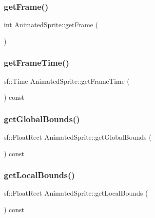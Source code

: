 \subsubsection{\texorpdfstring{get\+Frame()}{getFrame()}}
{\footnotesize\ttfamily int Animated\+Sprite\+::get\+Frame (\begin{DoxyParamCaption}{ }\end{DoxyParamCaption})}

\mbox{\label{class_animated_sprite_a5291f8e24fe2c6e4284bc7ff9499ef77}} 
\subsubsection{\texorpdfstring{get\+Frame\+Time()}{getFrameTime()}}
{\footnotesize\ttfamily sf\+::\+Time Animated\+Sprite\+::get\+Frame\+Time (\begin{DoxyParamCaption}{ }\end{DoxyParamCaption}) const}

\mbox{\label{class_animated_sprite_a86dca0906c53b3e630aaeac2f0085a0e}} 
\subsubsection{\texorpdfstring{get\+Global\+Bounds()}{getGlobalBounds()}}
{\footnotesize\ttfamily sf\+::\+Float\+Rect Animated\+Sprite\+::get\+Global\+Bounds (\begin{DoxyParamCaption}{ }\end{DoxyParamCaption}) const}

\mbox{\label{class_animated_sprite_ac4c88435c8698f452629c5cd78bfb3c9}} 
\subsubsection{\texorpdfstring{get\+Local\+Bounds()}{getLocalBounds()}}
{\footnotesize\ttfamily sf\+::\+Float\+Rect Animated\+Sprite\+::get\+Local\+Bounds (\begin{DoxyParamCaption}{ }\end{DoxyParamCaption}) const}

